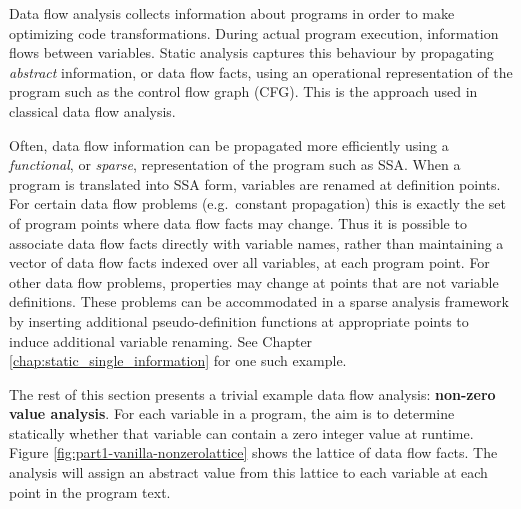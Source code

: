 
Data flow analysis collects information about programs
in order to make optimizing code transformations.
During actual program execution, information flows between
variables. Static analysis captures
this behaviour by propagating \textit{abstract} information,
or data flow facts,
using an operational representation of the 
program such as the control flow graph (CFG).
This is the approach used in 
classical data flow analysis.

Often, data flow information can be propagated more efficiently
using a \textit{functional}, or \textit{sparse},
representation of the program such 
as SSA.
When a program is translated into SSA form,
variables are renamed at definition points.
For certain data flow problems (e.g.\ constant propagation)
this is exactly the set of program points where data flow
facts may change.
Thus it is possible to associate data flow facts directly with 
variable names, rather than
maintaining a vector of data flow facts indexed over all variables,
at each program point.
For other data flow problems, properties may 
change at points that are not variable definitions.
These problems can be accommodated in a sparse analysis framework
by inserting additional pseudo-definition functions at appropriate 
points
to induce additional variable renaming. 
See Chapter \ref{chap:static_single_information}
for one such example.


The rest of this section presents a trivial example
data flow analysis: 
\textbf{non-zero value analysis}. 
For each variable in a program, the aim is to determine statically whether
that variable can contain a zero integer value at runtime.
Figure \ref{fig:part1-vanilla-nonzerolattice} shows the lattice of 
data flow facts. The analysis will assign an abstract value from this lattice
to each variable at each point in the program text.

